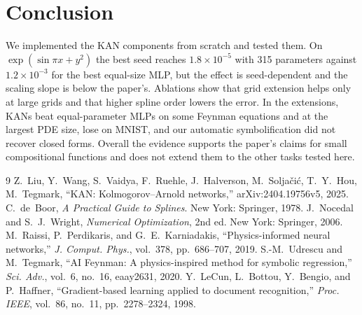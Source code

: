 \section{Conclusion}
We implemented the KAN components from scratch and tested them. On $\exp(\sin\pi x+y^2)$ the best seed reaches $1.8\times10^{-5}$ with 315 parameters against $1.2\times10^{-3}$ for the best equal-size MLP, but the effect is seed-dependent and the scaling slope is below the paper's. Ablations show that grid extension helps only at large grids and that higher spline order lowers the error. In the extensions, KANs beat equal-parameter MLPs on some Feynman equations and at the largest PDE size, lose on MNIST, and our automatic symbolification did not recover closed forms. Overall the evidence supports the paper's claims for small compositional functions and does not extend them to the other tasks tested here.

\begin{thebibliography}{9}\small
{} Z.~Liu, Y.~Wang, S.~Vaidya, F.~Ruehle, J.~Halverson, M.~Solja\v{c}i\'c, T.~Y.~Hou, M.~Tegmark, ``KAN: Kolmogorov--Arnold networks,'' arXiv:2404.19756v5, 2025.
 C.~de~Boor, \emph{A Practical Guide to Splines}. New York: Springer, 1978.
 J.~Nocedal and S.~J.~Wright, \emph{Numerical Optimization}, 2nd ed. New York: Springer, 2006.
 M.~Raissi, P.~Perdikaris, and G.~E.~Karniadakis, ``Physics-informed neural networks,'' \emph{J. Comput. Phys.}, vol.~378, pp.~686--707, 2019.
 S.-M.~Udrescu and M.~Tegmark, ``AI Feynman: A physics-inspired method for symbolic regression,'' \emph{Sci. Adv.}, vol.~6, no.~16, eaay2631, 2020.
 Y.~LeCun, L.~Bottou, Y.~Bengio, and P.~Haffner, ``Gradient-based learning applied to document recognition,'' \emph{Proc. IEEE}, vol.~86, no.~11, pp.~2278--2324, 1998.
\end{thebibliography}

